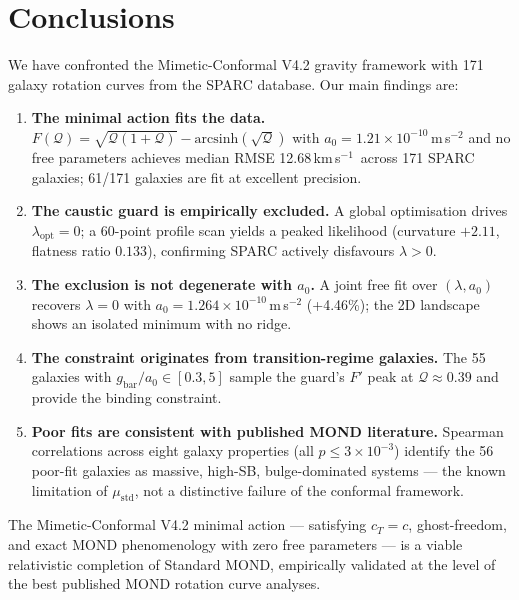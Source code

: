 \documentclass{aa}
\newcommand{\Q}{\mathcal{Q}}
\newcommand{\kms}{km\,s$^{-1}$}
\newcommand{\mstd}{\mu_\text{std}}
\newcommand{\gbar}{g_\text{bar}}
\newcommand{\azero}{a_0}
\newcommand{\lopt}{\lambda_\text{opt}}
\begin{document}
\section{Conclusions}
\label{sec:conclusions}

We have confronted the Mimetic-Conformal V4.2 gravity framework with 171
galaxy rotation curves from the SPARC database. Our main findings are:

\begin{enumerate}
  \item \textbf{The minimal action fits the data.} $F(\Q) = \sqrt{\Q(1+\Q)}
    - \mathrm{arcsinh}(\sqrt{\Q})$ with $\azero = 1.21 \times 10^{-10}$\,m\,s$^{-2}$
    and no free parameters achieves median RMSE 12.68\,\kms\ across 171
    SPARC galaxies; 61/171 galaxies are fit at excellent precision.

  \item \textbf{The caustic guard is empirically excluded.} A global
    optimisation drives $\lopt = 0$; a 60-point profile scan yields a peaked
    likelihood (curvature $+2.11$, flatness ratio $0.133$), confirming SPARC
    actively disfavours $\lambda > 0$.

  \item \textbf{The exclusion is not degenerate with $\azero$.} A joint free
    fit over $(\lambda, \azero)$ recovers $\lambda = 0$ with $\azero = 1.264
    \times 10^{-10}$\,m\,s$^{-2}$ (+4.46\%); the 2D landscape shows an
    isolated minimum with no ridge.

  \item \textbf{The constraint originates from transition-regime galaxies.}
    The 55 galaxies with $\gbar/\azero \in [0.3, 5]$ sample the guard's
    $F'$ peak at $\Q \approx 0.39$ and provide the binding constraint.

  \item \textbf{Poor fits are consistent with published MOND literature.}
    Spearman correlations across eight galaxy properties (all $p \leq
    3 \times 10^{-3}$) identify the 56 poor-fit galaxies as massive,
    high-SB, bulge-dominated systems --- the known limitation of $\mstd$,
    not a distinctive failure of the conformal framework.
\end{enumerate}

The Mimetic-Conformal V4.2 minimal action --- satisfying $c_T = c$,
ghost-freedom, and exact MOND phenomenology with zero free parameters --- is a
viable relativistic completion of Standard MOND, empirically validated at the
level of the best published MOND rotation curve analyses.
\end{document}
